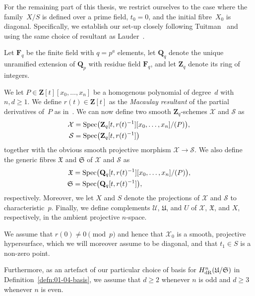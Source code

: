 For the remaining part of this thesis, we restrict ourselves to the case 
where the family~$X/S$ is defined over a prime field, $t_0 = 0$, and the 
initial fibre~$X_0$ is diagonal.  Specifically, we establish our set-up 
closely following Tuitman~\citep[\S 3.6]{Tuitman2011} and using the same 
choice of resultant as Lauder~\citep[\S 2.3.2]{Lauder2011}.

\begin{notation} \label{not:01-02-main}
Let $\mathbf{F}_q$ be the finite field with $q = p^a$ elements, 
let $\mathbf{Q}_q$ denote the unique unramified extension of $\mathbf{Q}_p$ 
with residue field $\mathbf{F}_q$, and let $\mathbf{Z}_q$ denote its 
ring of integers.

We let $P \in \mathbf{Z}[t][x_0,\dotsc,x_n]$ be a homogenous polynomial 
of degree~$d$ with $n, d \geq 1$.  We define $r(t) \in \mathbf{Z}[t]$ as 
the \emph{Macaulay resultant} of the partial derivatives of~$P$ as 
in~\citep[Page~7, Chapter~I.6]{Macaulay1994}.  We can now define two 
smooth $\mathbf{Z}_q$-schemes $\mathcal{X}$ and $\mathcal{S}$ as 
\begin{align*}
\mathcal{X} & = \operatorname{Spec}\bigl( \mathbf{Z}_q[t,r(t)^{-1}][x_0,\dotsc,x_n] / (P)\bigr), \\
\mathcal{S} & = \operatorname{Spec}\bigl( \mathbf{Z}_q[t,r(t)^{-1}] \bigr)
\end{align*}
together with the obvious smooth projective morphism 
$\mathcal{X} \to \mathcal{S}$.  We also define the generic fibres 
$\mathfrak{X}$ and $\mathfrak{S}$ of $\mathcal{X}$ and $\mathcal{S}$ as 
\begin{align*}
\mathfrak{X} & = \operatorname{Spec}\bigl( \mathbf{Q}_q[t,r(t)^{-1}][x_0,\dotsc,x_n] / (P)\bigr), \\
\mathfrak{S} & = \operatorname{Spec}\bigl( \mathbf{Q}_q[t,r(t)^{-1}] \bigr),
\end{align*}
respectively.  Moreover, we let $X$ and $S$ denote the projections 
of $\mathcal{X}$ and $\mathcal{S}$ to characteristic~$p$. 
Finally, we define complements $\mathcal{U}$, $\mathfrak{U}$, and $U$ 
of $\mathcal{X}$, $\mathfrak{X}$, and $X$, respectively, in the 
ambient projective $n$-space.

We assume that $r(0) \neq 0 \pmod{p}$ and hence that $\mathcal{X}_0$ is 
a smooth, projective hypersurface, which we will moreover assume to be 
diagonal, and that $t_1 \in S$ is a non-zero point.
\end{notation}

\begin{notation}
Furthermore, as an artefact of our particular choice of basis for 
$H_{\text{dR}}^n(\mathfrak{U}/\mathfrak{S})$ in Definition~\ref{defn:01-04-basis}, 
we assume that $d \geq 2$ whenever $n$ is odd and $d \geq 3$ whenever $n$ 
is even.
\end{notation}

